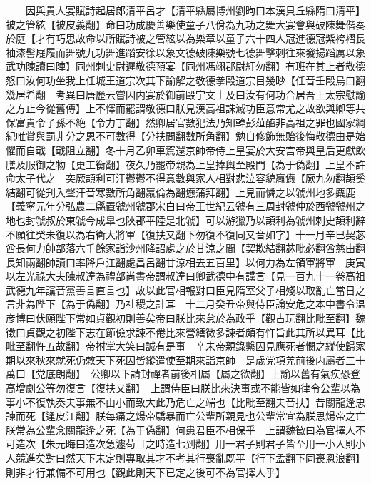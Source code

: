 　　因與貴人宴賦詩起居郎清平呂才【清平縣屬博州劉昫曰本漢貝丘縣隋曰清平】被之管絃【被皮義翻】命曰功成慶善樂使童子八佾為九功之舞大宴會與破陳舞偕奏於庭【才有巧思故命以所賦詩被之管絃以為樂章以童子六十四人冠進德冠紫袴褶長袖漆髻屣履而舞號九功舞進蹈安徐以象文德破陳樂號七德舞擊刺往來發揚蹈厲以象武功陳讀曰陣】同州刺史尉遲敬德預宴【同州馮翊郡尉紆勿翻】有班在其上者敬德怒曰汝何功坐我上任城王道宗次其下諭解之敬德拳毆道宗目幾眇【任音壬毆烏口翻幾居希翻　考異曰唐歷云嘗因内宴於御前毆宇文士及曰汝有何功合居吾上太宗慰諭之方止今從舊傳】上不懌而罷謂敬德曰朕見漢高祖誅滅功臣意常尤之故欲與卿等共保富貴令子孫不絶【令力丁翻】然卿居官數犯法乃知韓彭葅醢非高祖之罪也國家綱紀唯賞與罰非分之恩不可數得【分扶問翻數所角翻】勉自修飾無貽後悔敬德由是始懼而自戢【戢阻立翻】冬十月乙卯車駕還京師帝侍上皇宴於大安宫帝與皇后更獻飲膳及服御之物【更工衡翻】夜久乃罷帝親為上皇捧輿至殿門【為于偽翻】上皇不許命太子代之　突厥頡利可汗鬱鬱不得意數與家人相對悲泣容貌羸憊【厥九勿翻頡奚結翻可從刋入聲汗音寒數所角翻羸倫為翻憊蒲拜翻】上見而憐之以虢州地多麋鹿【義寜元年分弘農二縣置虢州虢郡宋白曰帝王世紀云虢有三周封虢仲於西虢虢州之地也封虢叔於東虢今成臯也陜郡平陸是北虢】可以游獵乃以頡利為虢州刺史頡利辭不願往癸未復以為右衛大將軍【復扶又翻下勿復不復同又音如字】十一月辛巳契苾酋長何力帥部落六千餘家詣沙州降詔處之於甘涼之間【契欺結翻苾毗必翻酋慈由翻長知兩翻帥讀曰率降戶江翻處昌呂翻甘涼相去五百里】以何力為左領軍將軍　庚寅以左光祿大夫陳叔達為禮部尚書帝謂叔達曰卿武德中有讜言【見一百九十一卷高祖武德九年讜音黨善言直言也】故以此官相報對曰臣見隋室父子相殘以取亂亡當日之言非為陛下【為于偽翻】乃社稷之計耳　十二月癸丑帝與侍臣論安危之本中書令温彦博曰伏願陛下常如貞觀初則善矣帝曰朕比來怠於為政乎【觀古玩翻比毗至翻】魏徵曰貞觀之初陛下志在節儉求諫不倦比來營繕微多諫者頗有忤旨此其所以異耳【比毗至翻忤五故翻】帝拊掌大笑曰誠有是事　辛未帝親錄繫囚見應死者憫之縱使歸家期以來秋來就死仍敕天下死囚皆縱遣使至期來詣京師　是歲党項羌前後内屬者三十萬口【党底朗翻】　公卿以下請封禪者前後相屬【屬之欲翻】上諭以舊有氣疾恐登高增劇公等勿復言【復扶又翻】　上謂侍臣曰朕比來決事或不能皆如律令公輩以為事小不復執奏夫事無不由小而致大此乃危亡之端也【比毗至翻夫音扶】昔關龍逢忠諫而死【逢皮江翻】朕每痛之煬帝驕暴而亡公輩所親見也公輩常宜為朕思煬帝之亡朕常為公輩念關龍逢之死【為于偽翻】何患君臣不相保乎　上謂魏徵曰為官擇人不可造次【朱元晦曰造次急遽苟且之時造七到翻】用一君子則君子皆至用一小人則小人競進矣對曰然天下未定則專取其才不考其行喪亂既平【行下孟翻下同喪悤浪翻】則非才行兼備不可用也【觀此則天下已定之後可不為官擇人乎】

